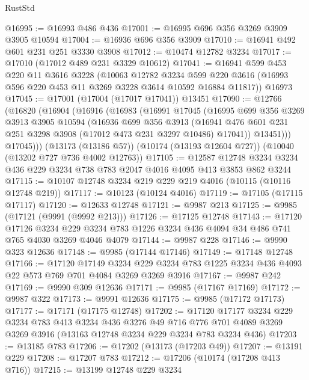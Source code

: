 \begin{lexlean}{RustStd}
\begin{coremodule}
@16995 := @16993 @486 @436
@17001 := @16995 @696 @356 @3269 @3909 @3905 @10594
@17004 := @16936 @696 @356 @3909
@17010 := @16941 @492 @601 @231 @251 @3330 @3908
@17012 := @10474 @12782 @3234
@17017 := @17010 (@17012 @489 @231 @3329 @10612)
@17041 := @16941
    @599
    @453
    @220
    @11
    @3616
    @3228
    (@10063
      @12782
      @3234
      @599
      @220
      @3616
      (@16993 @596 @220 @453 @11 @3269 @3228 @3614 @10592 @16884 @11817))
    @16973
@17045 := @17001 (@17004 (@17017 @17041)) @13451
@17090 := @12766
    (@16820
      (@16904
        (@16916
          (@16983
            (@16991
              @17045
              (@16995
                @699
                @356
                @3269
                @3913
                @3905
                @10594
                (@16936
                  @699
                  @356
                  @3913
                  (@16941 @476 @601 @231 @251 @3298 @3908 (@17012 @473 @231 @3297 @10486) @17041))
                @13451)))
          @17045)))
    (@13173 (@13186 @57))
    (@10174 (@13193 @12604 @727))
    (@10040 (@13202 @727 @736 @4002 @12763))
@17105 := @12587
    @12748
    @3234
    @3234
    @436
    @229
    @3234
    @738
    @783
    @2047
    @4016
    @4095
    @413
    @3853
    @862
    @3244
@17115 := @10107 @12748 @3234 @219 @229 @219 @4016 (@10115 (@10116 @12748 @219))
@17117 := @10123 (@10124 @4016)
@17119 := @17105 (@17115 @17117)
@17120 := @12633 @12748
@17121 := @9987 @213
@17125 := @9985 (@17121 (@9991 (@9992 @213)))
@17126 := @17125 @12748
@17143 := @17120
    @17126
    @3234
    @229
    @3234
    @783
    @1226
    @3234
    @436
    @4094
    @34
    @486
    @741
    @765
    @4030
    @3269
    @4046
    @4079
@17144 := @9987 @228
@17146 := @9990 @323 @12636
@17148 := @9985 (@17144 @17146)
@17149 := @17148 @12748
@17166 := @17120
    @17149
    @3234
    @229
    @3234
    @783
    @1225
    @3234
    @436
    @4093
    @22
    @573
    @769
    @701
    @4084
    @3269
    @3269
    @3916
@17167 := @9987 @242
@17169 := @9990 @309 @12636
@17171 := @9985 (@17167 @17169)
@17172 := @9987 @322
@17173 := @9991 @12636
@17175 := @9985 (@17172 @17173)
@17177 := @17171 (@17175 @12748)
@17202 := @17120
    @17177
    @3234
    @229
    @3234
    @783
    @413
    @3234
    @436
    @3276
    @49
    @716
    @776
    @701
    @4089
    @3269
    @3269
    @3916
    (@13163 @12748 @3234 @229 @3234 @783 @3234 @436)
@17203 := @13185 @783
@17206 := @17202 (@13173 (@17203 @49))
@17207 := @13191 @229
@17208 := @17207 @783
@17212 := @17206 (@10174 (@17208 @413 @716))
@17215 := @13199 @12748 @229 @3234

\end{coremodule}
\end{lexlean}
